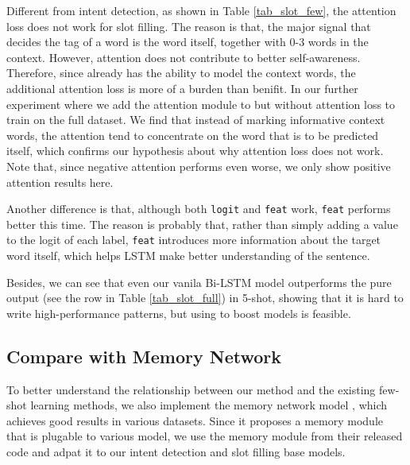 Different from intent detection, as shown in Table \ref{tab_slot_few}, the attention loss does not work for slot filling.
The reason is that, the major signal that decides the tag of a word is the word itself, together with 0-3 words in the context.
However, attention does not contribute to better self-awareness. 
Therefore, since \BLSTM already has the ability to model the context words, the additional attention loss is more of a burden than benifit.
In our further experiment where we add the attention module to \BLSTM but without attention loss to train on the full dataset. 
We find that instead of marking informative context words, the attention tend to concentrate on the word that is to be predicted itself, which confirms our hypothesis about why attention loss does not work. 
Note that, since negative attention performs even worse, we only show positive attention results here.

Another difference is that, although both \texttt{logit} and \texttt{feat} work, \texttt{feat} performs better this time. The reason is probably that, rather than simply adding a value to the logit of each label, \texttt{feat} introduces more information about the target word itself, which helps LSTM make better understanding of the sentence.


Besides, we can see that even our vanila Bi-LSTM model outperforms the pure \RE output (see the \RE row in Table \ref{tab_slot_full}) in 5-shot, showing that it is hard to write high-performance \RE patterns, but using \RE to boost \NN models is feasible. 


\subsection{Compare with Memory Network}
To better understand the relationship between our method and the existing few-shot learning methods, we also implement the memory network model \cite{kaiser2017learning}, which achieves good results in various datasets. Since it proposes a memory module that is plugable to various model, we use the memory module from their released code and adpat it to our intent detection and slot filling base models.

